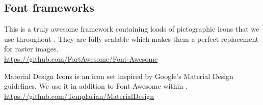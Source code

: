 \subsection{Font frameworks}

\begin{description}[align=left,style=nextline,leftmargin=*,labelsep=\parindent,font=\bfseries]
	\item[Font Awesome] This is a truly awesome framework containing loads of pictographic icons that we use throughout {\germinate}. They are fully scalable which makes them a perfect replacement for raster images. \\\url{https://github.com/FortAwesome/Font-Awesome}
\end{description}

\begin{description}[align=left,style=nextline,leftmargin=*,labelsep=\parindent,font=\bfseries]
	\item[Material Design Icons] Material Design Icons is an icon set inspired by Google's Material Design guidelines. We use it in addition to Font Awesome within {\germinate}. \\\url{https://github.com/Templarian/MaterialDesign}
\end{description}


